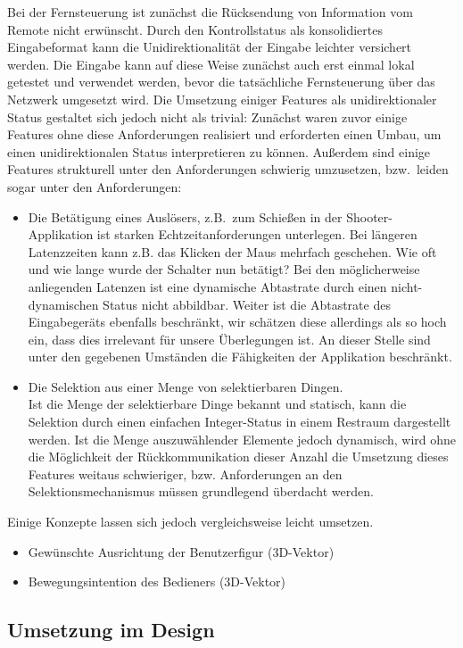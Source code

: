 Bei der Fernsteuerung ist zunächst die Rücksendung von Information vom Remote nicht erwünscht. Durch den Kontrollstatus als konsolidiertes Eingabeformat kann die Unidirektionalität der Eingabe leichter versichert werden. Die Eingabe kann auf diese Weise zunächst auch erst einmal lokal getestet und verwendet werden, bevor die tatsächliche Fernsteuerung über das Netzwerk umgesetzt wird.
Die Umsetzung einiger Features als unidirektionaler Status gestaltet sich jedoch nicht als trivial:
Zunächst waren zuvor einige Features ohne diese Anforderungen realisiert und erforderten einen Umbau, um einen unidirektionalen Status interpretieren zu können.
Außerdem sind einige Features strukturell unter den Anforderungen schwierig umzusetzen, bzw.~leiden sogar unter den Anforderungen:
\begin{itemize}
\item Die Betätigung eines Auslösers, z.B.~zum Schießen in der Shooter-Applikation ist starken Echtzeitanforderungen unterlegen. Bei längeren Latenzzeiten kann z.B. das Klicken der Maus mehrfach geschehen. Wie oft und wie lange wurde der Schalter nun betätigt? Bei den möglicherweise anliegenden Latenzen ist eine dynamische Abtastrate durch einen nicht-dynamischen Status nicht abbildbar. Weiter ist die Abtastrate des Eingabegeräts ebenfalls beschränkt, wir schätzen diese allerdings als so hoch ein, dass dies irrelevant für unsere Überlegungen ist. An dieser Stelle sind unter den gegebenen Umständen die Fähigkeiten der Applikation beschränkt.
\item Die Selektion aus einer Menge von selektierbaren Dingen.\\
Ist die Menge der selektierbare Dinge bekannt und statisch, kann die Selektion durch einen einfachen Integer-Status  in einem Restraum dargestellt werden. Ist die Menge auszuwählender Elemente jedoch dynamisch, wird ohne die Möglichkeit der Rückkommunikation dieser Anzahl die Umsetzung dieses Features weitaus schwieriger, bzw. Anforderungen an den Selektionsmechanismus müssen grundlegend überdacht werden.
\end{itemize}

Einige Konzepte lassen sich jedoch vergleichsweise leicht umsetzen.
\begin{itemize}
\item Gewünschte Ausrichtung der Benutzerfigur (3D-Vektor)
\item Bewegungsintention des Bedieners (3D-Vektor)
\end{itemize}

\subsection{Umsetzung im Design}

